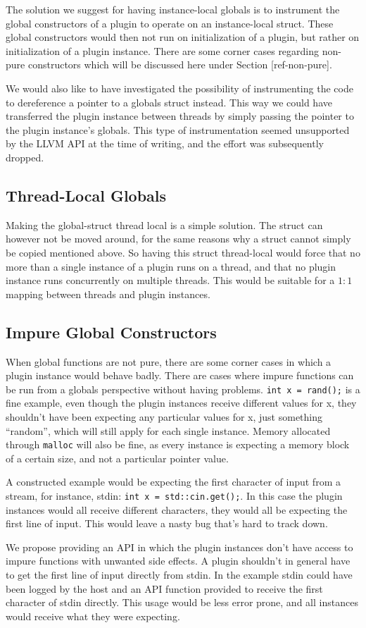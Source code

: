 The solution we suggest for having instance-local globals is to instrument the
global constructors of a plugin to operate on an instance-local struct. These
global constructors would then not run on initialization of a plugin, but rather
on initialization of a plugin instance. There are some corner cases regarding
non-pure constructors which will be discussed here under Section [ref-non-pure].

We would also like to have investigated the possibility of instrumenting the
code to dereference a pointer to a globals struct instead. This way we could
have transferred the plugin instance between threads by simply passing the
pointer to the plugin instance's globals. This type of instrumentation seemed
unsupported by the LLVM API at the time of writing, and the effort was
subsequently dropped.

\subsection {Thread-Local Globals}

Making the global-struct thread local is a simple solution. The struct can
however not be moved around, for the same reasons why a struct cannot simply be
copied mentioned above. So having this struct thread-local would force that no
more than a single instance of a plugin runs on a thread, and that no plugin
instance runs concurrently on multiple threads. This would be suitable for a
$1:1$ mapping between threads and plugin instances.

\subsection {Impure Global Constructors}

When global functions are not pure, there are some corner cases in which a
plugin instance would behave badly. There are cases where impure functions can
be run from a globals perspective without having problems.
\texttt{int x = rand();} is a fine example, even though the plugin instances
receive different values for x, they shouldn't have been expecting any
particular values for x, just something ``random'', which will still apply for
each single instance. Memory allocated through \texttt{malloc} will also be
fine, as every instance is expecting a memory block of a certain size, and not
a particular pointer value.

A constructed example would be expecting the first character of input from a
stream, for instance, stdin: \texttt{int x = std::cin.get();}. In this case the
plugin instances would all receive different characters, they would all be
expecting the first line of input. This would leave a nasty bug that's hard to
track down.

We propose providing an API in which the plugin instances don't have access to
impure functions with unwanted side effects. A plugin shouldn't in general have
to get the first line of input directly from stdin. In the example stdin could
have been logged by the host and an API function provided to receive the first
character of stdin directly. This usage would be less error prone, and all
instances would receive what they were expecting.

